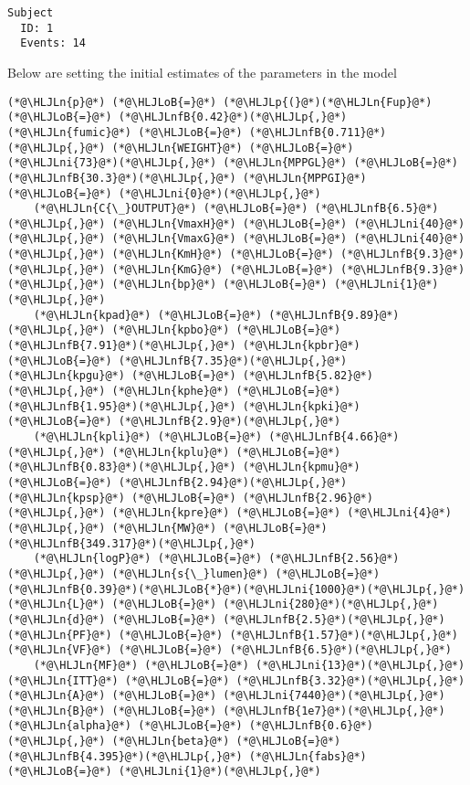 \documentclass[12pt,a4paper]{article}
\newcommand{\HLJLn}[1]{#1}
\newcommand{\HLJLnfB}[1]{\textcolor[RGB]{59,151,46}{#1}}
\newcommand{\HLJLni}[1]{\textcolor[RGB]{59,151,46}{#1}}
\newcommand{\HLJLoB}[1]{\textcolor[RGB]{102,102,102}{\textbf{#1}}}
\newcommand{\HLJLp}[1]{#1}
\begin{document}
\begin{lstlisting}
Subject
  ID: 1
  Events: 14
\end{lstlisting}


Below are setting the initial estimates of the parameters in the model


\begin{lstlisting}
(*@\HLJLn{p}@*) (*@\HLJLoB{=}@*) (*@\HLJLp{(}@*)(*@\HLJLn{Fup}@*) (*@\HLJLoB{=}@*) (*@\HLJLnfB{0.42}@*)(*@\HLJLp{,}@*) (*@\HLJLn{fumic}@*) (*@\HLJLoB{=}@*) (*@\HLJLnfB{0.711}@*)(*@\HLJLp{,}@*) (*@\HLJLn{WEIGHT}@*) (*@\HLJLoB{=}@*) (*@\HLJLni{73}@*)(*@\HLJLp{,}@*) (*@\HLJLn{MPPGL}@*) (*@\HLJLoB{=}@*) (*@\HLJLnfB{30.3}@*)(*@\HLJLp{,}@*) (*@\HLJLn{MPPGI}@*) (*@\HLJLoB{=}@*) (*@\HLJLni{0}@*)(*@\HLJLp{,}@*)
    (*@\HLJLn{C{\_}OUTPUT}@*) (*@\HLJLoB{=}@*) (*@\HLJLnfB{6.5}@*)(*@\HLJLp{,}@*) (*@\HLJLn{VmaxH}@*) (*@\HLJLoB{=}@*) (*@\HLJLni{40}@*)(*@\HLJLp{,}@*) (*@\HLJLn{VmaxG}@*) (*@\HLJLoB{=}@*) (*@\HLJLni{40}@*)(*@\HLJLp{,}@*) (*@\HLJLn{KmH}@*) (*@\HLJLoB{=}@*) (*@\HLJLnfB{9.3}@*)(*@\HLJLp{,}@*) (*@\HLJLn{KmG}@*) (*@\HLJLoB{=}@*) (*@\HLJLnfB{9.3}@*)(*@\HLJLp{,}@*) (*@\HLJLn{bp}@*) (*@\HLJLoB{=}@*) (*@\HLJLni{1}@*)(*@\HLJLp{,}@*)
    (*@\HLJLn{kpad}@*) (*@\HLJLoB{=}@*) (*@\HLJLnfB{9.89}@*)(*@\HLJLp{,}@*) (*@\HLJLn{kpbo}@*) (*@\HLJLoB{=}@*) (*@\HLJLnfB{7.91}@*)(*@\HLJLp{,}@*) (*@\HLJLn{kpbr}@*) (*@\HLJLoB{=}@*) (*@\HLJLnfB{7.35}@*)(*@\HLJLp{,}@*) (*@\HLJLn{kpgu}@*) (*@\HLJLoB{=}@*) (*@\HLJLnfB{5.82}@*)(*@\HLJLp{,}@*) (*@\HLJLn{kphe}@*) (*@\HLJLoB{=}@*) (*@\HLJLnfB{1.95}@*)(*@\HLJLp{,}@*) (*@\HLJLn{kpki}@*) (*@\HLJLoB{=}@*) (*@\HLJLnfB{2.9}@*)(*@\HLJLp{,}@*)
    (*@\HLJLn{kpli}@*) (*@\HLJLoB{=}@*) (*@\HLJLnfB{4.66}@*)(*@\HLJLp{,}@*) (*@\HLJLn{kplu}@*) (*@\HLJLoB{=}@*) (*@\HLJLnfB{0.83}@*)(*@\HLJLp{,}@*) (*@\HLJLn{kpmu}@*) (*@\HLJLoB{=}@*) (*@\HLJLnfB{2.94}@*)(*@\HLJLp{,}@*) (*@\HLJLn{kpsp}@*) (*@\HLJLoB{=}@*) (*@\HLJLnfB{2.96}@*)(*@\HLJLp{,}@*) (*@\HLJLn{kpre}@*) (*@\HLJLoB{=}@*) (*@\HLJLni{4}@*)(*@\HLJLp{,}@*) (*@\HLJLn{MW}@*) (*@\HLJLoB{=}@*) (*@\HLJLnfB{349.317}@*)(*@\HLJLp{,}@*)
    (*@\HLJLn{logP}@*) (*@\HLJLoB{=}@*) (*@\HLJLnfB{2.56}@*)(*@\HLJLp{,}@*) (*@\HLJLn{s{\_}lumen}@*) (*@\HLJLoB{=}@*) (*@\HLJLnfB{0.39}@*)(*@\HLJLoB{*}@*)(*@\HLJLni{1000}@*)(*@\HLJLp{,}@*) (*@\HLJLn{L}@*) (*@\HLJLoB{=}@*) (*@\HLJLni{280}@*)(*@\HLJLp{,}@*) (*@\HLJLn{d}@*) (*@\HLJLoB{=}@*) (*@\HLJLnfB{2.5}@*)(*@\HLJLp{,}@*) (*@\HLJLn{PF}@*) (*@\HLJLoB{=}@*) (*@\HLJLnfB{1.57}@*)(*@\HLJLp{,}@*) (*@\HLJLn{VF}@*) (*@\HLJLoB{=}@*) (*@\HLJLnfB{6.5}@*)(*@\HLJLp{,}@*)
    (*@\HLJLn{MF}@*) (*@\HLJLoB{=}@*) (*@\HLJLni{13}@*)(*@\HLJLp{,}@*) (*@\HLJLn{ITT}@*) (*@\HLJLoB{=}@*) (*@\HLJLnfB{3.32}@*)(*@\HLJLp{,}@*) (*@\HLJLn{A}@*) (*@\HLJLoB{=}@*) (*@\HLJLni{7440}@*)(*@\HLJLp{,}@*) (*@\HLJLn{B}@*) (*@\HLJLoB{=}@*) (*@\HLJLnfB{1e7}@*)(*@\HLJLp{,}@*) (*@\HLJLn{alpha}@*) (*@\HLJLoB{=}@*) (*@\HLJLnfB{0.6}@*)(*@\HLJLp{,}@*) (*@\HLJLn{beta}@*) (*@\HLJLoB{=}@*) (*@\HLJLnfB{4.395}@*)(*@\HLJLp{,}@*) (*@\HLJLn{fabs}@*) (*@\HLJLoB{=}@*) (*@\HLJLni{1}@*)(*@\HLJLp{,}@*)

\end{lstlisting}
\end{document}
